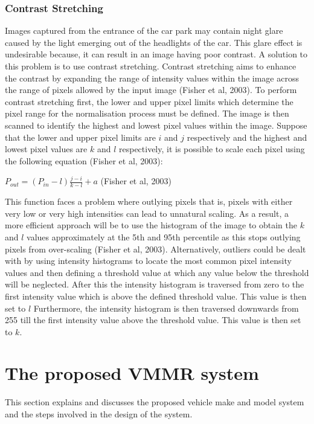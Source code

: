 \documentclass[a4paper, 12pt]{article}
\begin{document}
\subsubsection{Contrast Stretching}
Images captured from the entrance of the car park may contain night glare caused by the light emerging out of the headlights of the car. This glare effect is undesirable because, it can result in an image having poor contrast. A solution to this problem is to use contrast stretching. Contrast stretching aims to enhance the contrast by expanding the range of intensity values within the image across the range of pixels allowed by the input image (Fisher et al, 2003). To perform contrast stretching first, the lower and upper pixel limits which determine the pixel range for the normalisation process must be defined. The image is then scanned to identify the highest and lowest pixel values within the image. Suppose that the lower and upper pixel limits are $i$ and $j$ respectively and the highest and lowest pixel values are $k$ and $l$ respectively, it is possible to scale each pixel using the following equation (Fisher et al, 2003): 

\begin{center}
$P_{out} = (P_{in}-l)\frac{j-i}{k-l} + a$ (Fisher et al, 2003)
\end{center}

This function faces a problem where outlying pixels that is, pixels with either very low or very high intensities can lead to unnatural scaling. As a result, a more efficient approach will be to use the histogram of the image to obtain the $k$ and $l$ values approximately at the 5th and 95th percentile as this stops outlying pixels from over-scaling (Fisher et al, 2003). Alternatively, outliers could be dealt with by using intensity histograms to locate the most common pixel intensity values and then defining a threshold value at which any value below the threshold will be neglected. After this the intensity histogram is traversed from zero to the first intensity value which is above the defined threshold value. This value is then set to $l$ Furthermore, the  intensity histogram is then traversed downwards from 255 till the first intensity value above the threshold value. This value is then set to $k$.

\section{The proposed VMMR system}
This section explains and discusses the proposed vehicle make and model system and the steps involved in the design of the system.
\end{document}
